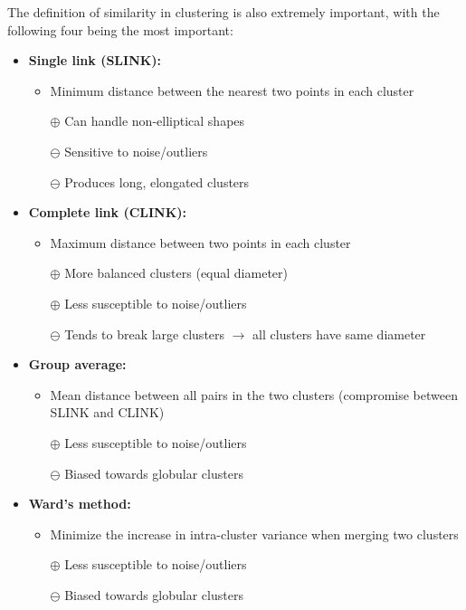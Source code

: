 The definition of similarity in clustering is also extremely important, with the following four being the most important:

\begin{itemize}
    \item \textbf{Single link (SLINK):}
    \begin{itemize}
        \item Minimum distance between the nearest two points in each cluster
        \item[$\oplus$] Can handle non-elliptical shapes
        \item[$\ominus$] Sensitive to noise/outliers
        \item[$\ominus$] Produces long, elongated clusters
    \end{itemize}
    \item \textbf{Complete link (CLINK):}
    \begin{itemize}
        \item Maximum distance between two points in each cluster
        \item[$\oplus$] More balanced clusters (equal diameter)
        \item[$\oplus$] Less susceptible to noise/outliers
        \item[$\ominus$] Tends to break large clusters $\rightarrow$ all clusters have same diameter
    \end{itemize}
    \item \textbf{Group average:}
    \begin{itemize}
        \item Mean distance between all pairs in the two clusters (compromise between SLINK and CLINK)
        \item[$\oplus$] Less susceptible to noise/outliers
        \item[$\ominus$] Biased towards globular clusters
    \end{itemize}
    \item \textbf{Ward's method:}
    \begin{itemize}
        \item Minimize the increase in intra-cluster variance when merging two clusters
        \item[$\oplus$] Less susceptible to noise/outliers
        \item[$\ominus$] Biased towards globular clusters
    \end{itemize}
\end{itemize}

